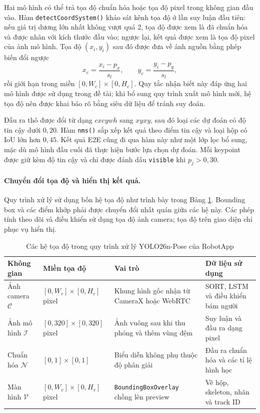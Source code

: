 Hai mô hình có thể trả tọa độ chuẩn hóa hoặc tọa độ pixel trong không gian đầu vào. Hàm \texttt{detectCoordSystem()} khảo sát kênh tọa độ ở lần suy luận đầu tiên: nếu giá trị dương lớn nhất không vượt quá 2, tọa độ được xem là đã chuẩn hóa và được nhân với kích thước đầu vào; ngược lại, kết quả được xem là tọa độ pixel của ảnh mô hình. Tọa độ $(x_i,y_i)$ sau đó được đưa về ảnh nguồn bằng phép biến đổi ngược
\begin{equation}
x_c=\frac{x_i-p_x}{s_l},\qquad y_c=\frac{y_i-p_y}{s_l},
\end{equation}
rồi giới hạn trong miền $[0,W_c]\times[0,H_c]$. Quy tắc nhận biết này đáp ứng hai mô hình được sử dụng trong đề tài; khi bổ sung quy trình xuất mô hình mới, hệ tọa độ nên được khai báo rõ bằng siêu dữ liệu để tránh suy đoán.

Đầu ra thô được đổi từ dạng $cxcywh$ sang $xyxy$, sau đó loại các dự đoán có độ tin cậy dưới $0{,}20$. Hàm \texttt{nms()} sắp xếp kết quả theo điểm tin cậy và loại hộp có IoU lớn hơn $0{,}45$. Kết quả E2E cũng đi qua hàm này như một lớp lọc bổ sung, mặc dù mô hình đầu cuối đã thực hiện bước lựa chọn dự đoán. Mỗi keypoint được giữ kèm độ tin cậy và chỉ được đánh dấu \texttt{visible} khi $p_j>0{,}30$.

\paragraph{Chuyển đổi tọa độ và hiển thị kết quả.}
Quy trình xử lý sử dụng bốn hệ tọa độ như trình bày trong Bảng \ref{tab:yolo_coordinate_systems}. Bounding box và các điểm khớp phải được chuyển đổi nhất quán giữa các hệ này. Các phép tính theo dõi và điều khiển sử dụng tọa độ ảnh camera; tọa độ trên giao diện chỉ phục vụ hiển thị.

\begin{table}[htbp]
\centering
\caption{Các hệ tọa độ trong quy trình xử lý YOLO26n-Pose của RobotApp}
\label{tab:yolo_coordinate_systems}
\renewcommand{\arraystretch}{1.12}
\small
\begin{tabularx}{\textwidth}{|p{2.35cm}|p{2.35cm}|X|X|}
\hline
\textbf{Không gian} & \textbf{Miền tọa độ} & \textbf{Vai trò} & \textbf{Dữ liệu sử dụng} \\
\hline
Ảnh camera $\mathcal{C}$ & $[0,W_c]\times[0,H_c]$ pixel & Khung hình gốc nhận từ CameraX hoặc WebRTC & SORT, LSTM và điều khiển bám người \\
\hline
Ảnh mô hình $\mathcal{I}$ & $[0,320]\times[0,320]$ pixel & Ảnh vuông sau khi thu phóng và thêm vùng đệm & Suy luận và đầu ra dạng pixel \\
\hline
Chuẩn hóa $\mathcal{N}$ & $[0,1]\times[0,1]$ & Biểu diễn không phụ thuộc độ phân giải & Đầu ra chuẩn hóa và các tỉ lệ hình học \\
\hline
Màn hình $\mathcal{V}$ & $[0,W_v]\times[0,H_v]$ pixel & \texttt{BoundingBoxOverlay} chồng lên preview & Vẽ hộp, skeleton, nhãn và track ID \\
\hline
\end{tabularx}
\end{table}

